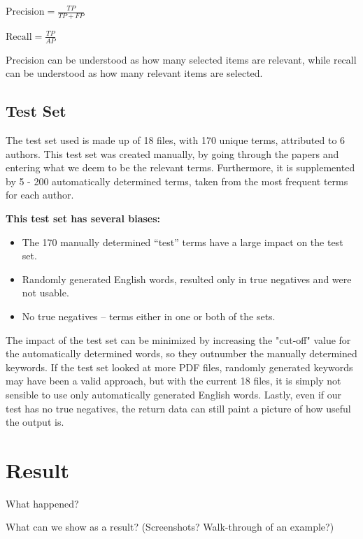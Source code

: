 \documentclass[a4paper,12pt]{article}
\begin{document}
\begin{center}
    $\text{Precision} = \frac{TP}{TP + FP} $
\end{center}

\begin{center}
    $\text{Recall} = \frac{TP}{AP} $
\end{center}

Precision can be understood as how many selected items are relevant, 
while recall can be understood as how many relevant items are selected.


\subsection{Test Set}
The test set used is made up of 18 files, with 170 unique terms, attributed to 6 authors.
This test set was created manually, by going through the papers and entering what we deem to be the relevant terms.
Furthermore, it is supplemented by 5 - 200 automatically determined terms, taken from the most frequent terms for each author. 


\textbf{This test set has several biases: }

\begin{itemize}
    \item The 170 manually determined “test” terms have a large impact on the test set.
    \item Randomly generated English words, resulted only in true negatives and were not usable.
    \item No true negatives – terms either in one or both of the sets.
\end{itemize}

The impact of the test set can be minimized by increasing the "cut-off" value for the automatically determined words, so they outnumber the manually determined keywords.
If the test set looked at more PDF files, randomly generated keywords may have been a valid approach, but with the current 18 files, it is simply not sensible to use only automatically generated English words.
Lastly, even if our test has no true negatives, the return data can still paint a picture of how useful the output is.


\section {Result} %
What happened?

What can we show as a result? (Screenshots? Walk-through of an example?)
\end{document}
